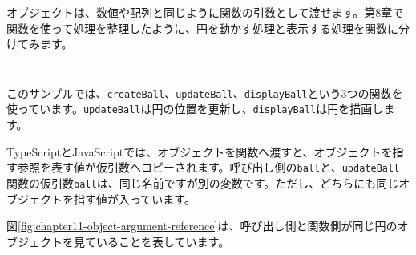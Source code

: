 オブジェクトは、数値や配列と同じように関数の引数として渡せます。第8章で関数を使って処理を整理したように、円を動かす処理と表示する処理を関数に分けてみます。

\begin{listing}[htbp]
\inputminted[firstline=1,lastline=43]{ts}{typescript-p5/listings/chapter11/ball-object-functions.ts}
\caption{オブジェクトを作り、関数を呼び出す（\texttt{chapter11/ball-object-functions.ts}）}
\label{lst:chapter11-ball-object-functions-main}
\end{listing}

\begin{listing}[htbp]
\inputminted[firstline=45,lastline=77]{ts}{typescript-p5/listings/chapter11/ball-object-functions.ts}
\caption{オブジェクトを受け取って更新と描画を行う関数（\texttt{chapter11/ball-object-functions.ts}）}
\label{lst:chapter11-ball-object-functions-helpers}
\end{listing}

このサンプルでは、\texttt{createBall}、\texttt{updateBall}、\texttt{displayBall}という3つの関数を使っています。\texttt{updateBall}は円の位置を更新し、\texttt{displayBall}は円を描画します。

TypeScriptとJavaScriptでは、オブジェクトを関数へ渡すと、オブジェクトを指す参照を表す値が仮引数へコピーされます。呼び出し側の\texttt{ball}と、\texttt{updateBall}関数の仮引数\texttt{ball}は、同じ名前ですが別の変数です。ただし、どちらにも同じオブジェクトを指す値が入っています。

図\ref{fig:chapter11-object-argument-reference}は、呼び出し側と関数側が同じ円のオブジェクトを見ていることを表しています。

